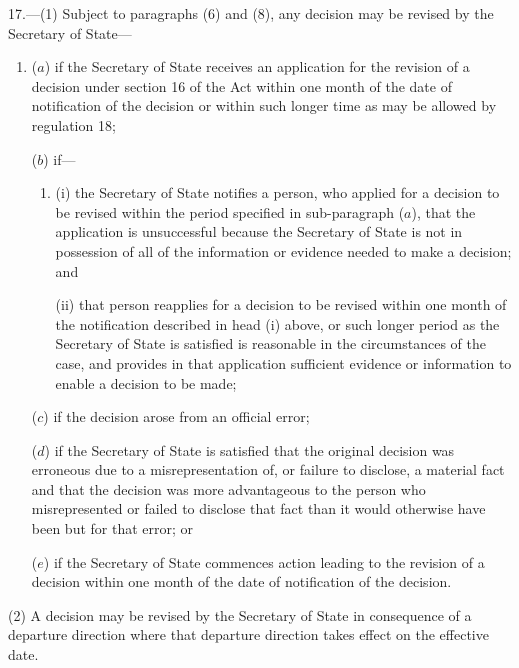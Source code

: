 \documentclass[a4paper,12pt]{article}
\begin{document}
17.—(1) Subject to paragraphs (6) and (8), any decision may be revised by the Secretary of State---
\begin{enumerate}\item[]
($a$) if the Secretary of State receives an application for the revision of a decision under section 16 of the Act within one month of the date of notification of the decision or within such longer time as may be allowed by regulation 18;

($b$) if---
\begin{enumerate}\item[]
(i) the Secretary of State notifies a person, who applied for a decision to be revised within the period specified in sub-paragraph ($a$), that the application is unsuccessful because the Secretary of State is not in possession of all of the information or evidence needed to make a decision; and

(ii) that person reapplies for a decision to be revised within one month of the notification described in head (i) above, or such longer period as the Secretary of State is satisfied is reasonable in the circumstances of the case, and provides in that application sufficient evidence or information to enable a decision to be made;
\end{enumerate}

($c$) if the decision arose from an official error;

($d$) if the Secretary of State is satisfied that the original decision was erroneous due to a misrepresentation of, or failure to disclose, a material fact and that the decision was more advantageous to the person who misrepresented or failed to disclose that fact than it would otherwise have been but for that error; or

($e$) if the Secretary of State commences action leading to the revision of a decision within one month of the date of notification of the decision.
\end{enumerate}

(2) A decision may be revised by the Secretary of State in consequence of a departure direction where that departure direction takes effect on the effective date.
\end{document}
